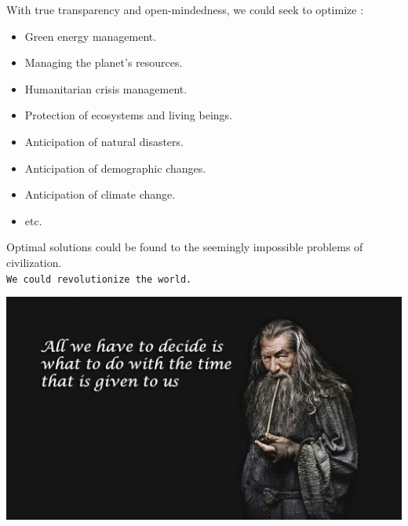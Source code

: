 With true transparency and open-mindedness, we could seek to optimize :\\

\begin{itemize}
\item Green energy management.
\item Managing the planet's resources.
\item Humanitarian crisis management.
\item Protection of ecosystems and living beings.
\item Anticipation of natural disasters.
\item Anticipation of demographic changes.
\item Anticipation of climate change.
\item etc.\\
\end{itemize}

Optimal solutions could be found to the seemingly impossible problems of civilization.\\

\texttt{\Large \comfortaa We could revolutionize the world.}

\begin{center}
\includegraphics[scale=0.25]{Media/GandalfQuote.jpg}
\end{center}